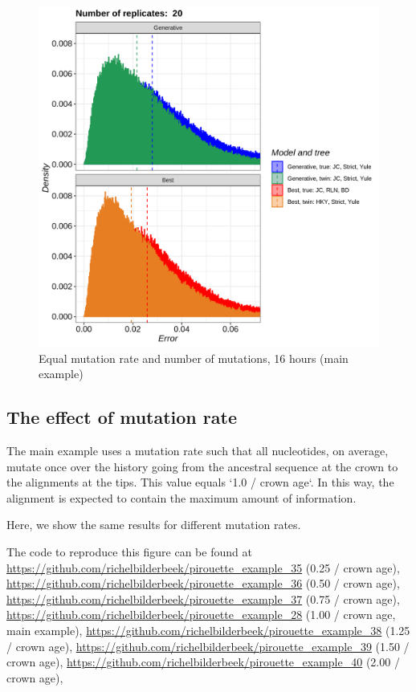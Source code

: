\begin{figure}[H]
  \includegraphics[width=\textwidth]{pirouette_example_28/errors.png}
  \caption{Equal mutation rate and number of mutations, 16 hours (main example)}
\end{figure}

\subsection{The effect of mutation rate}
\label{subsec:mutation_rate}

The main example uses a mutation rate such that all nucleotides,
on average, mutate once over the history going from the
ancestral sequence at the crown to the alignments at the tips.
This value equals `1.0 / crown age`.
In this way, the alignment is expected to contain the maximum
amount of information.

Here, we show the same results for different mutation rates.

The code to reproduce this figure can be found at  
\url{https://github.com/richelbilderbeek/pirouette_example_35} (0.25 / crown age),
\url{https://github.com/richelbilderbeek/pirouette_example_36} (0.50 / crown age),
\url{https://github.com/richelbilderbeek/pirouette_example_37} (0.75 / crown age),
\url{https://github.com/richelbilderbeek/pirouette_example_28} (1.00 / crown age, main example),
\url{https://github.com/richelbilderbeek/pirouette_example_38} (1.25 / crown age),
\url{https://github.com/richelbilderbeek/pirouette_example_39} (1.50 / crown age),
\url{https://github.com/richelbilderbeek/pirouette_example_40} (2.00 / crown age),

